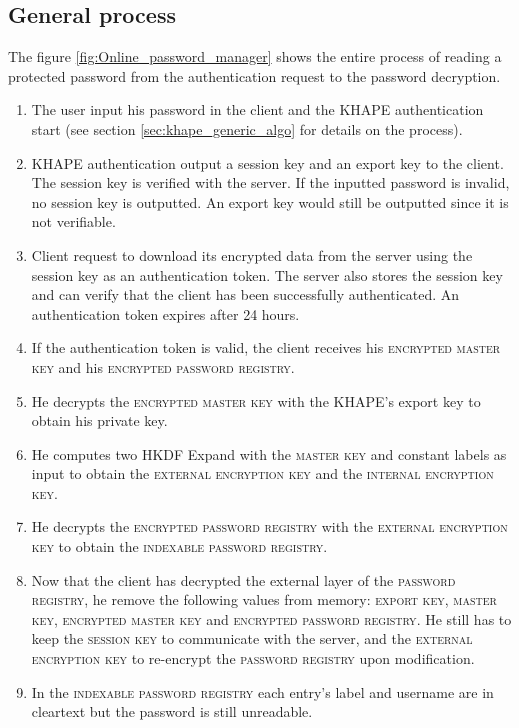 \documentclass[../report.tex]{subfiles}
\begin{document}
\subsection{General process}
The figure \ref{fig:Online_password_manager} shows the entire process of reading a protected password from the authentication request to the password decryption.
\begin{enumerate}
 \item The user input his password in the client and the KHAPE authentication start (see section \ref{sec:khape_generic_algo} for details on the process).
 \item KHAPE authentication output a session key and an export key to the client. The session key is verified with the server. If the inputted password is invalid, no session key is outputted. An export key would still be outputted since it is not verifiable.
 \item Client request to download its encrypted data from the server using the session key as an authentication token. The server also stores the session key and can verify that the client has been successfully authenticated. An authentication token expires after 24 hours.
 \item If the authentication token is valid, the client receives his \textsc{encrypted master key} and his \textsc{encrypted password registry}.
 \item He decrypts the \textsc{encrypted master key} with the KHAPE's export key to obtain his private key.
 \item He computes two HKDF Expand with the \textsc{master key} and constant labels as input to obtain the \textsc{external encryption key} and the \textsc{internal encryption key}.
 \item He decrypts the \textsc{encrypted password registry} with the \textsc{external encryption key} to obtain the \textsc{indexable password registry}.
 \item Now that the client has decrypted the external layer of the \textsc{password registry}, he remove the following values from memory: \textsc{export key}, \textsc{master key}, \textsc{encrypted master key} and \textsc{encrypted password registry}. He still has to keep the \textsc{session key} to communicate with the server, and the \textsc{external encryption key} to re-encrypt the \textsc{password registry} upon modification.
 \item In the \textsc{indexable password registry} each entry's label and username are in cleartext but the password is still unreadable. 

\end{enumerate}
\end{document}
